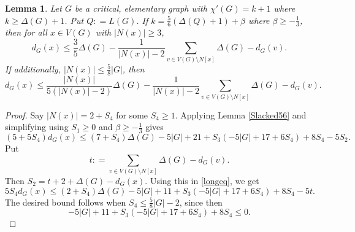 \documentclass[12pt]{amsart}
\theoremstyle{plain}
\newtheorem{lem}[thm]{Lemma}
\theoremstyle{definition}
\theoremstyle{remark}
\newcommand{\card}[1]{\left|#1\right|}
\newcommand{\parens}[1]{\left( #1 \right)}
\newcommand{\DefinedAs}{\mathrel{\mathop:}=}
\begin{document}
\begin{lem}\label{DegreeBoundedForMiddling}
Let $G$ be a critical, elementary graph with $\chi'(G) = k + 1$ where $k \ge \Delta(G) + 1$.  Put $Q \DefinedAs L(G)$. 
If $k = \frac56\parens{\Delta(Q) + 1} + \beta$ where $\beta \ge -\frac13$, then for all $x \in V(G)$ with $\card{N(x)} \ge 3$,
\[d_G(x) \le \frac{3}{5}\Delta(G) - \frac{1}{\card{N(x)} - 2}\sum_{v \in V(G)\setminus N[x]} \Delta(G) - d_G(v).\]
If additionally, $\card{N(x)} \le \frac58\card{G}$, then
\[d_G(x) \le \frac{\card{N(x)}}{5\parens{\card{N(x)} - 2}}\Delta(G) - \frac{1}{\card{N(x)} - 2}\sum_{v \in V(G)\setminus N[x]} \Delta(G) - d_G(v).\]
\end{lem}
\begin{proof}
Say $|N(x)| = 2 + S_4$ for some $S_4 \ge 1$.  Applying Lemma \ref{Slacked56} and simplifying using $S_1 \ge 0$ and $\beta \ge -\frac13$ gives
\begin{equation}\label{longeq}
(5+5S_4)d_G(x) \le (7 + S_4)\Delta(G) - 5|G| + 21 + S_3(-5|G| + 17 + 6S_4) + 8S_4 - 5S_2.
\end{equation}
Put 
\[t \DefinedAs \sum_{v \in V(G) \setminus N[x]} \Delta(G) - d_G(v).\]
Then $S_2 = t + 2 + \Delta(G) - d_G(x)$.  Using this in \eqref{longeq}, we get
\begin{equation}\label{longeq2}
5S_4d_G(x) \le (2 + S_4)\Delta(G) - 5|G| + 11 + S_3(-5|G| + 17 + 6S_4) + 8S_4 - 5t.
\end{equation}
The desired bound follows when $S_4 \le \frac58\card{G} - 2$, since then
\[- 5|G| + 11 + S_3(-5|G| + 17 + 6S_4) + 8S_4 \le 0.\]


\end{proof}
\end{document}
